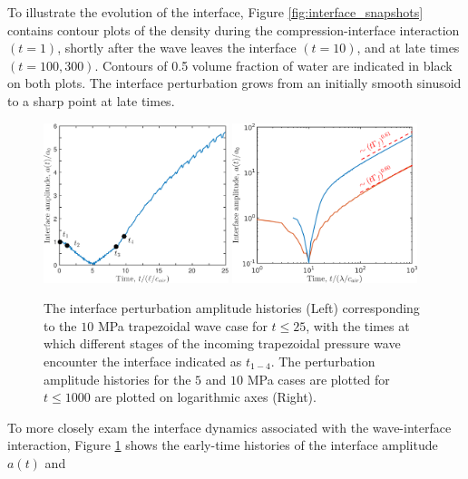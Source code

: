 %
To illustrate the evolution of the interface, Figure
\ref{fig:interface_snapshots} contains contour plots of the density
during the compression-interface interaction $(t=1)$, shortly after
the wave leaves the interface $(t=10)$, and at late times
$(t=100, 300)$. Contours of 0.5 volume fraction of water are indicated
in black on both plots. The interface perturbation grows from an
initially smooth sinusoid to a sharp point at late times.
%
\begin{figure}[h] 
  \centering
  \includegraphics[width=0.48\textwidth]{./figs/lung_figs/trapz10_intf_schematic}
  \includegraphics[width=0.48\textwidth]{./figs/lung_figs/interface_multi-amp_loglog_roe_t1000}
  \caption[The interface perturbation amplitude histories]{The
    interface perturbation amplitude histories (Left) corresponding to
    the $10$ MPa trapezoidal wave case for $t\leq25$, with the times
    at which different stages of the incoming trapezoidal pressure
    wave encounter the interface indicated as $t_{1-4}$. The
    perturbation amplitude histories for the $5$ and $10$ MPa cases
    are plotted for $t\leq1000$ are plotted on logarithmic axes (Right).}
  \label{fig:trapz10_circ_interface}
\end{figure}
%
To more closely exam the interface dynamics associated with the
wave-interface interaction, Figure \ref{fig:trapz10_circ_interface}
shows the early-time histories of the interface amplitude $a(t)$ and
